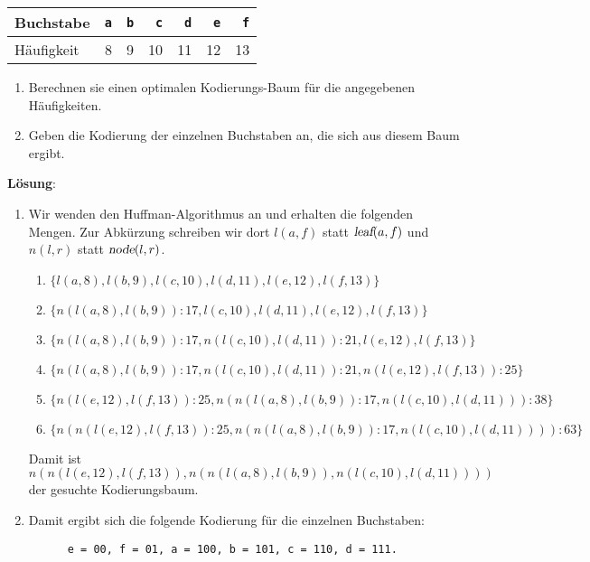 \documentclass{article}
\begin{document}
\begin{center}
\begin{tabular}[t]{|l|r|r|r|r|r|r|}
\hline
Buchstabe  & \texttt{a} & \texttt{b} & \texttt{c} & \texttt{d} & \texttt{e} & \texttt{f} \\
\hline
H\"aufigkeit &          8 &          9 &         10 &         11 &         12 &         13 \\
\hline
\end{tabular}
\end{center}
\begin{enumerate}
\item Berechnen sie einen optimalen Kodierungs-Baum f\"ur die angegebenen H\"aufigkeiten.
\item Geben die Kodierung der einzelnen Buchstaben an, die sich aus diesem Baum ergibt.
\end{enumerate}

\noindent
\textbf{L\"osung}:
\begin{enumerate}
\item Wir wenden den Huffman-Algorithmus an und erhalten die folgenden Mengen.  Zur Abk\"urzung
      schreiben wir dort $l(a,f)$ statt $\textsl{leaf}(a,f)$ und $n(l,r)$ statt $\textsl{node}(l,r)$.
      \begin{enumerate}
      \item $\{ l(a,8), l(b,9), l(c,10), l(d,11), l(e,12), l(f,13) \}$
      \item $\{ n(l(a,8), l(b,9)):17, l(c,10), l(d,11), l(e,12), l(f,13) \}$
      \item $\{ n(l(a,8), l(b,9)):17, n(l(c,10), l(d,11)):21, l(e,12), l(f,13) \}$
      \item $\{ n(l(a,8), l(b,9)):17, n(l(c,10), l(d,11)):21, n(l(e,12), l(f,13)):25 \}$
      \item $\{ n(l(e,12), l(f,13)):25, n(n(l(a,8), l(b,9)):17, n(l(c,10), l(d,11))):38 \}$
      \item $\{ n(n(l(e,12), l(f,13)):25, n(n(l(a,8), l(b,9)):17, n(l(c,10), l(d,11)))):63 \}$
      \end{enumerate}
      Damit ist 
      \\[0.2cm]
      \hspace*{1.3cm} $n(n(l(e,12), l(f,13)), n(n(l(a,8), l(b,9)), n(l(c,10), l(d,11))))$
      \\[0.2cm]
      der gesuchte Kodierungsbaum.
\item Damit ergibt sich die folgende Kodierung f\"ur die einzelnen Buchstaben:
      \begin{verbatim}
      e = 00, f = 01, a = 100, b = 101, c = 110, d = 111.
      \end{verbatim}
\end{enumerate}
\end{document}
